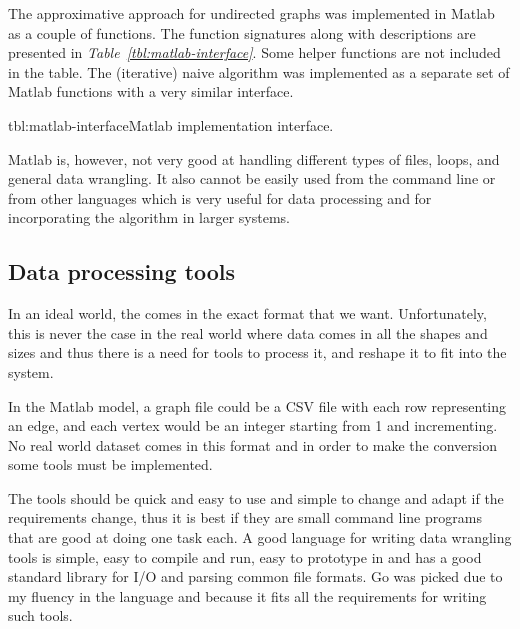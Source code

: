 \documentclass[12pt]{report}
\begin{document}
The approximative approach for undirected graphs was implemented in Matlab as a
couple of functions. The function signatures along with descriptions are
presented in \emph{Table~\ref{tbl:matlab-interface}}. Some helper functions are
not included in the table. The (iterative) naive algorithm was implemented as a
separate set of Matlab functions with a very similar interface.

\begin{methodListC}{tbl:matlab-interface}{Matlab implementation interface.}
\end{methodListC}

Matlab is, however, not very good at handling different types of files, loops,
and general data wrangling. It also cannot be easily used from the command line
or from other languages which is very useful for data processing and for
incorporating the algorithm in larger systems.

\subsection{Data processing tools}

In an ideal world, the comes in the exact format that we want. Unfortunately,
this is never the case in the real world where data comes in all the shapes and
sizes and thus there is a need for tools to process it, and reshape it to fit
into the system.


In the Matlab model, a graph file could be a CSV file with each row representing
an edge, and each vertex would be an integer starting from 1 and incrementing.
No real world dataset comes in this format and in order to make the conversion
some tools must be implemented.


The tools should be quick and easy to use and simple to change and adapt if the
requirements change, thus it is best if they are small command line programs
that are good at doing one task each. A good language for writing data wrangling
tools is simple, easy to compile and run, easy to prototype in and has a good
standard library for I/O and parsing common file formats. Go was picked due to
my fluency in the language and because it fits all the requirements for writing
such tools.
\end{document}
